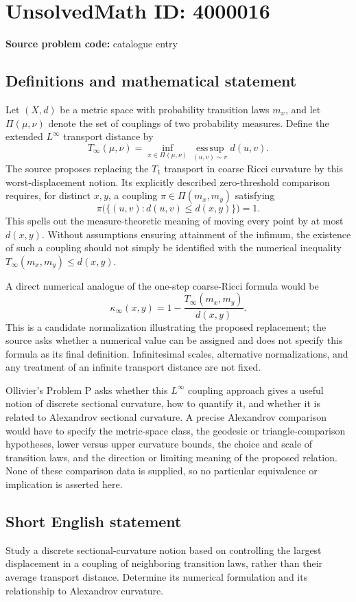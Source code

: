 \documentclass[11pt]{article}
\begin{document}
\section*{UnsolvedMath ID: 4000016}
\textbf{Source problem code:} catalogue entry
\subsection{Definitions and mathematical statement}
Let $(X,d)$ be a metric space with probability transition laws $m_x$, and let $\Pi(\mu,\nu)$ denote the set of couplings of two probability measures. Define the extended $L^\infty$ transport distance by
\[
 T_\infty(\mu,\nu)=\inf_{\pi\in\Pi(\mu,\nu)}
          \operatorname*{ess\,sup}_{(u,v)\sim\pi} d(u,v).
\]
The source proposes replacing the $T_1$ transport in coarse Ricci curvature by this worst-displacement notion. Its explicitly described zero-threshold comparison requires, for distinct $x,y$, a coupling $\pi\in\Pi(m_x,m_y)$ satisfying
\[
 \pi\bigl(\{(u,v):d(u,v)\le d(x,y)\}\bigr)=1.
\]
This spells out the measure-theoretic meaning of moving every point by at most $d(x,y)$. Without assumptions ensuring attainment of the infimum, the existence of such a coupling should not simply be identified with the numerical inequality $T_\infty(m_x,m_y)\le d(x,y)$.

A direct numerical analogue of the one-step coarse-Ricci formula would be
\[
 \kappa_\infty(x,y)=1-\frac{T_\infty(m_x,m_y)}{d(x,y)}.
\]
This is a candidate normalization illustrating the proposed replacement; the source asks whether a numerical value can be assigned and does not specify this formula as its final definition. Infinitesimal scales, alternative normalizations, and any treatment of an infinite transport distance are not fixed.

Ollivier's Problem P asks whether this $L^\infty$ coupling approach gives a useful notion of discrete sectional curvature, how to quantify it, and whether it is related to Alexandrov sectional curvature. A precise Alexandrov comparison would have to specify the metric-space class, the geodesic or triangle-comparison hypotheses, lower versus upper curvature bounds, the choice and scale of transition laws, and the direction or limiting meaning of the proposed relation. None of these comparison data is supplied, so no particular equivalence or implication is asserted here.
\subsection{Short English statement}
Study a discrete sectional-curvature notion based on controlling the largest displacement in a coupling of neighboring transition laws, rather than their average transport distance. Determine its numerical formulation and its relationship to Alexandrov curvature.
\end{document}
